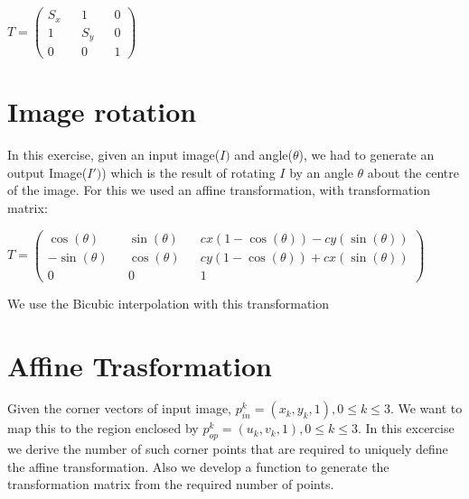\documentclass[paper=a4, fontsize=11pt]{scrartcl} %
\numberwithin{equation}{section} %
\numberwithin{figure}{section} %
\numberwithin{table}{section} %
\begin{document}
\(
  T = 
  \begin{pmatrix}
    S_x && 1 && 0 \\
    1 && S_y && 0 \\
    0 && 0 && 1
  \end{pmatrix}
\) 


\section{Image rotation}

In this exercise, given an input image(\(I)\) and angle(\(\theta\)), we had to generate an output Image(\(I')\)) which is the result of rotating \(I\) by an angle \(\theta\) about the centre of the image. For this we used an affine transformation, with transformation matrix:

\(
  T = 
  \begin{pmatrix}
    \cos(\theta) && \sin(\theta) && cx(1-\cos(\theta)) - cy(\sin(\theta)) \\
    -\sin(\theta) && \cos(\theta) && cy(1 - \cos(\theta)) + cx(\sin(\theta)) \\
    0 && 0 && 1
  \end{pmatrix}
\) 

We use the Bicubic interpolation with this transformation




\section{Affine Trasformation}

Given the corner vectors of input image, \(p_{in}^k = (x_k,y_k,1), 0 \leq k \leq 3\). We want to map this to the region enclosed by \(p_{op}^k = (u_k,v_k,1), 0 \leq k \leq 3 \). In this excercise we derive the number of such corner points that are required to uniquely define the affine transformation. Also we develop a function to generate the transformation matrix from the required number of points.
\end{document}
